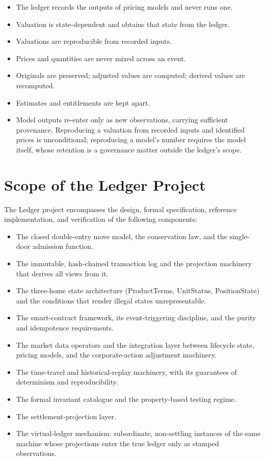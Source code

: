 \documentclass[11pt,a4paper]{article}
\providecommand{\tightlist}{\setlength{\itemsep}{2pt}\setlength{\parskip}{0pt}}
\begin{document}
\begin{itemize}
\tightlist
\item
  The ledger records the outputs of pricing models and never runs one.
\item
  Valuation is state-dependent and obtains that state from the ledger.
\item
  Valuations are reproducible from recorded inputs.
\item
  Prices and quantities are never mixed across an event.
\item
  Originals are preserved; adjusted values are computed; derived values
  are recomputed.
\item
  Estimates and entitlements are kept apart.
\item
  Model outputs re-enter only as new observations, carrying sufficient
  provenance. Reproducing a valuation from recorded inputs and
  identified prices is unconditional; reproducing a model's number
  requires the model itself, whose retention is a governance matter
  outside the ledger's scope.
\end{itemize}

\hypertarget{scope-of-the-ledger-project}{%
\section{Scope of the Ledger
Project}\label{scope-of-the-ledger-project}}

The Ledger project encompasses the design, formal specification,
reference implementation, and verification of the following components:

\begin{itemize}
\tightlist
\item
  The closed double-entry move model, the conservation law, and the
  single-door admission function.
\item
  The immutable, hash-chained transaction log and the projection
  machinery that derives all views from it.
\item
  The three-home state architecture (ProductTerms, UnitStatus,
  PositionState) and the conditions that render illegal states
  unrepresentable.
\item
  The smart-contract framework, its event-triggering discipline, and the
  purity and idempotence requirements.
\item
  The market data operators and the integration layer between lifecycle
  state, pricing models, and the corporate-action adjustment machinery.
\item
  The time-travel and historical-replay machinery, with its guarantees
  of determinism and reproducibility.
\item
  The formal invariant catalogue and the property-based testing regime.
\item
  The settlement-projection layer.
\item
  The virtual-ledger mechanism: subordinate, non-settling instances of
  the same machine whose projections enter the true ledger only as
  stamped observations.
\end{itemize}
\end{document}
